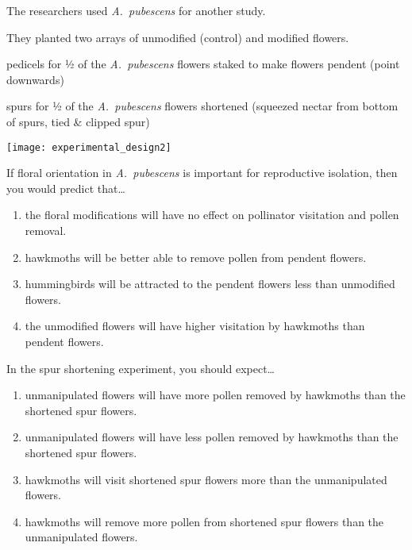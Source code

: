 \documentclass[t,hidelinks]{beamer}
\newcommand{\ques}[1]{\highlight{\textsc{q#1:}}}
\begin{document}
\begin{frame}[t]{The researchers used \textit{A.~pubescens} for another study.}
	
	\vspace*{-\baselineskip}
	
	\hangpara They planted two arrays of unmodified (control) and modified flowers.

	\hangpara {} pedicels for ½ of the \textit{A.~pubescens} flowers staked to make flowers pendent (point downwards)
	
	\hangpara {} spurs for ½ of the \textit{A.~pubescens} flowers shortened (squeezed nectar from bottom of spurs, tied \& clipped spur)
	
	\centering
	\texttt{[image: experimental\_design2]}

\end{frame}
%
\begin{frame}[t]{\ques9 If floral orientation in \textit{A.~pubescens} is important for reproductive isolation, then you would predict that\dots}
	
	
	\begin{enumerate}
		\item the floral modifications will have no effect on pollinator visitation and pollen removal.
		\item hawkmoths will be better able to remove pollen from pendent flowers.
		\item hummingbirds will be attracted to the pendent flowers less than unmodified flowers.
		\item \alert<2>{the unmodified flowers will have higher visitation by hawkmoths than pendent flowers.}
	\end{enumerate}
\end{frame}
%
\begin{frame}[t]{\ques{10} In the spur shortening experiment, you should expect\dots}
	\begin{enumerate}
		\item \alert<2>{unmanipulated flowers will have more pollen removed by hawkmoths than the shortened spur flowers.}
		\item unmanipulated  flowers will have less pollen removed by hawkmoths than the shortened spur flowers.
		\item hawkmoths will visit shortened spur flowers more than the unmanipulated flowers.
		\item hawkmoths will remove more pollen from shortened spur flowers than the unmanipulated flowers.
	\end{enumerate}

\end{frame}
\end{document}
